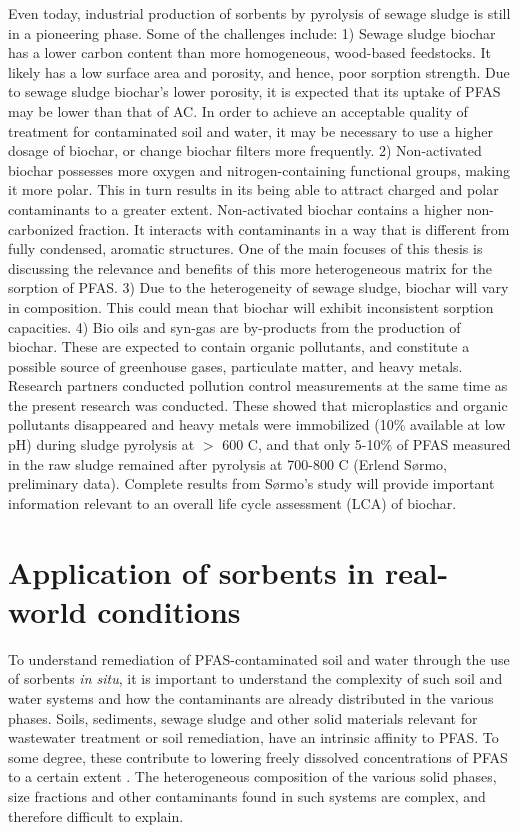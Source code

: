 Even today, industrial production of sorbents by pyrolysis of sewage sludge is still in a pioneering phase. Some of the challenges include: 1) Sewage sludge biochar has a lower carbon content than more homogeneous, wood-based feedstocks. It likely has a low surface area and porosity, and hence, poor sorption strength. Due to sewage sludge biochar's lower porosity, it is expected that its uptake of PFAS may be lower than that of AC. In order to achieve an acceptable quality of treatment for contaminated soil and water, it may be necessary to use a higher dosage of biochar, or change  biochar filters more frequently. 2) Non-activated biochar possesses more oxygen and nitrogen-containing functional groups, making it more polar. This in turn results in its being able to attract charged and polar contaminants to a greater extent. Non-activated biochar contains a higher non-carbonized fraction. It interacts with contaminants in a way that is different from fully condensed, aromatic structures. One of the main focuses of this thesis is discussing the relevance and benefits of this more heterogeneous matrix for the sorption of PFAS. 3) Due to the heterogeneity of sewage sludge, biochar will vary in composition. This could mean that biochar will exhibit inconsistent sorption capacities. 4) Bio oils and syn-gas are by-products from the production of biochar. These are expected to contain organic pollutants, and constitute a possible source of greenhouse gases, particulate matter, and heavy metals. Research partners conducted pollution control measurements at the same time as the present research was conducted. These showed that microplastics and organic pollutants disappeared and heavy metals were immobilized (10\% available at low pH) during sludge pyrolysis at $>$ 600 \textdegree C, and that only 5-10\% of PFAS measured in the raw sludge remained after pyrolysis at 700-800 \textdegree C (Erlend S\o rmo, preliminary data). Complete results from S\o rmo's study will provide important information relevant to an overall life cycle assessment (\acrshort{LCA}) of biochar.

\section{Application of sorbents in real-world conditions \label{sec:attenuation}}
To understand remediation of PFAS-contaminated soil and water through the use of sorbents \textit{in situ}, it is important to understand the complexity of such soil and water systems and how the contaminants are already distributed in the various phases. Soils, sediments, sewage sludge and other solid materials relevant for wastewater treatment or soil remediation, have an intrinsic affinity to PFAS. To some degree, these contribute to lowering freely dissolved concentrations of PFAS to a certain extent \citep{arvaniti2014,zhang2013sorption}. The heterogeneous composition of the various solid phases, size fractions and other contaminants found in such systems are complex, and therefore difficult to explain. 

